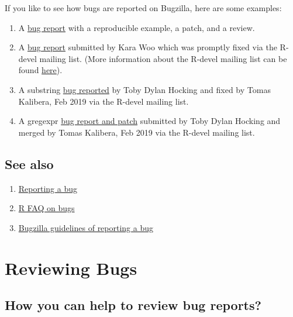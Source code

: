 \documentclass[
]{book}
\begin{document}
If you like to see how bugs are reported on Bugzilla, here are some examples:

\begin{enumerate}
\def\labelenumi{\arabic{enumi}.}
\item
  A \href{https://bugs.r-project.org/bugzilla/show_bug.cgi?id=17767}{bug report} with a reproducible example, a patch, and a review.
\item
  A \href{https://stat.ethz.ch/pipermail/r-devel/2019-May/077855.html}{bug report} submitted by Kara Woo which was promptly fixed via the R-devel mailing list. (More information about the R-devel mailing list can be found \href{https://stat.ethz.ch/mailman/listinfo/r-devel}{here}).
\item
  A substring \href{https://stat.ethz.ch/pipermail/r-devel/2019-February/077393.html}{bug reported} by Toby Dylan Hocking and fixed by Tomas Kalibera, Feb 2019 via the R-devel mailing list.
\item
  A gregexpr \href{https://stat.ethz.ch/pipermail/r-devel/2019-February/077315.html}{bug report and patch} submitted by Toby Dylan Hocking and merged by Tomas Kalibera, Feb 2019 via the R-devel mailing list.
\end{enumerate}

\hypertarget{see-also-1}{%
\section{See also}\label{see-also-1}}

\begin{enumerate}
\def\labelenumi{\arabic{enumi}.}
\item
  \href{https://www.r-project.org/bugs.html}{Reporting a bug}
\item
  \href{https://mac.r-project.org/man/R-FAQ.html\#R-Bugs}{R FAQ on bugs}
\item
  \href{https://bugs.r-project.org/bugzilla/page.cgi?id=bug-writing.html}{Bugzilla guidelines of reporting a bug}
\end{enumerate}

\hypertarget{ReviewBugs}{%
\chapter{Reviewing Bugs}\label{ReviewBugs}}

\hypertarget{how-you-can-help-to-review-bug-reports}{%
\section{How you can help to review bug reports?}\label{how-you-can-help-to-review-bug-reports}}
\end{document}
